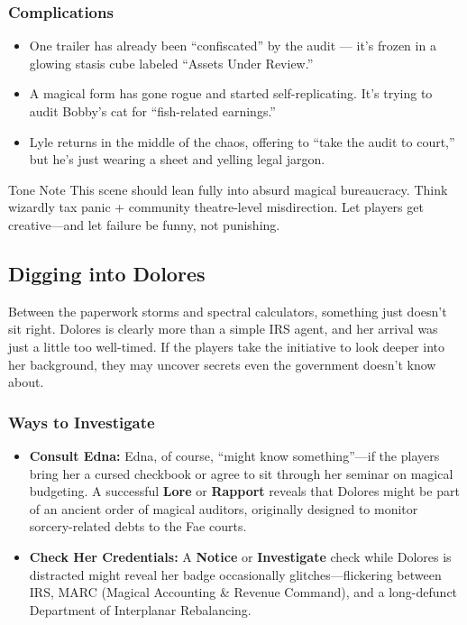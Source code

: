 \begin{multicols}{2}
\subsubsection*{Complications}
\begin{itemize}
    \item One trailer has already been “confiscated” by the audit — it's frozen in a glowing stasis cube labeled “Assets Under Review.”
    \item A magical form has gone rogue and started self-replicating. It’s trying to audit Bobby’s cat for “fish-related earnings.”
    \item Lyle returns in the middle of the chaos, offering to “take the audit to court,” but he’s just wearing a sheet and yelling legal jargon.
\end{itemize}

\begin{CommentBox}{Tone Note}
    This scene should lean fully into absurd magical bureaucracy. Think wizardly tax panic + community theatre-level misdirection. Let players get creative—and let failure be funny, not punishing.
\end{CommentBox}



\subsection{Digging into Dolores}

Between the paperwork storms and spectral calculators, something just doesn’t sit right. Dolores is clearly more than a simple IRS agent, and her arrival was just a little too well-timed. If the players take the initiative to look deeper into her background, they may uncover secrets even the government doesn’t know about.

\subsubsection*{Ways to Investigate}
\begin{itemize}
    \item \textbf{Consult Edna:} Edna, of course, “might know something”—if the players bring her a cursed checkbook or agree to sit through her seminar on magical budgeting. A successful \textbf{Lore} or \textbf{Rapport}  reveals that Dolores might be part of an ancient order of magical auditors, originally designed to monitor sorcery-related debts to the Fae courts.
    
    \item \textbf{Check Her Credentials:} A \textbf{Notice} or \textbf{Investigate}  check while Dolores is distracted might reveal her badge occasionally glitches—flickering between IRS, MARC (Magical Accounting \& Revenue Command), and a long-defunct Department of Interplanar Rebalancing.


\end{itemize}
\end{multicols}
